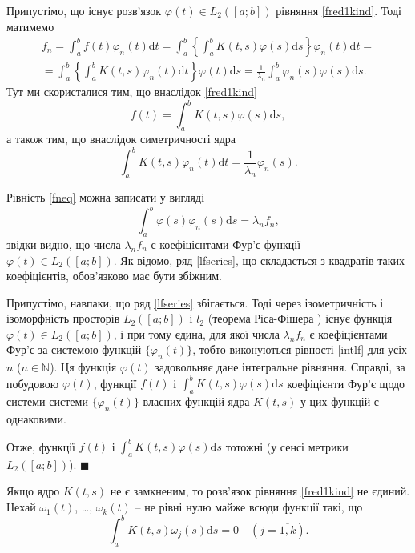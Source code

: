 \documentclass[14pt,twoside]{extreport}
\theoremstyle{mystyle}
\renewenvironment{proof}{{\bfseries Доведення.}}{$\blacksquare$}
\numberwithin{equation}{chapter}
\begin{document}
\begin{proof}
Припустімо, що існує розв'язок $\varphi(t) \in L_2([a; b])$ рівняння \eqref{fred1kind}. Тоді матимемо
\begin{multline}\label{fneq}
 f_n = \int_{a}^{b} f(t) \varphi_n(t) \mathrm{d}t = \int_{a}^{b} \left\{\int_{a}^{b} K(t, s) \varphi(s) \mathrm{d}s\right\}\varphi_n(t) \mathrm{d}t=\\
=\int_{a}^{b} \left\{\int_{a}^{b} K(t, s) \varphi_n(t) \mathrm{d}t\right\}\varphi(t) \mathrm{d}s = \frac{1}{\lambda_n} \int_{a}^{b} \varphi_n(s) \varphi(s) \mathrm{d}s.
\end{multline}
Тут ми скористалися тим, що внаслідок \eqref{fred1kind}
\[
 f(t) = \int_{a}^{b} K(t, s) \varphi(s) \mathrm{d}s,
\]
а також тим, що внаслідок симетричності ядра
\[
 \int_{a}^{b} K(t, s) \varphi_n(t) \mathrm{d}t = \frac{1}{\lambda_n} \varphi_n(s).
\]

Рівність \eqref{fneq} можна записати у вигляді
\begin{equation}\label{intlf}
 \int_{a}^{b} \varphi(s) \varphi_n(s) \mathrm{d}s = \lambda_n f_n,
\end{equation}
звідки видно, що числа $\lambda_n f_n$ є коефіцієнтами Фур'є функції $\varphi(t) \in L_2([a; b])$. Як відомо, ряд \eqref{lfseries}, що складається з квадратів таких коефіцієнтів, обов'язково має бути збіжним.

Припустімо, навпаки, що ряд \eqref{lfseries} збігається. Тоді через ізометричність і ізоморфність просторів $L_2([a; b])$ і $l_2$ (теорема Ріса-Фішера \cite{Sobolev}) існує функція $\varphi(t) \in L_2([a; b])$, і при тому єдина, для якої числа $\lambda_n f_n$ є коефіцієнтами Фур'є за системою функцій $\{\varphi_n(t)\}$, тобто виконуються рівності \eqref{intlf} для усіх $n$ ($n \in \mathbb{N}$). Ця функція $\varphi(t)$ задовольняє дане інтегральне рівняння. Справді, за побудовою $\varphi(t)$, функції $f(t)$ і $\int_{a}^{b} K(t, s) \varphi(s) \mathrm{d}s$ коефіцієнти Фур'є щодо системи системи $\{\varphi_n(t)\}$ власних функцій ядра $K(t, s)$ у цих функцій є однаковими.

Отже, функції $f(t)$ і $\int_{a}^{b} K(t, s) \varphi(s) \mathrm{d}s$ тотожні (у сенсі метрики $L_2([a; b])$).
\end{proof}

Якщо ядро $K(t, s)$ не є замкненим, то розв'язок рівняння \eqref{fred1kind} не єдиний. Нехай $\omega_1(t)$, \ldots, $\omega_k(t)$ -- не рівні нулю майже всюди функції такі, що
\[
 \int_{a}^{b} K(t, s) \omega_j(s) \mathrm{d}s = 0 \quad (j = \overline{1, k}).
\]
\end{document}
